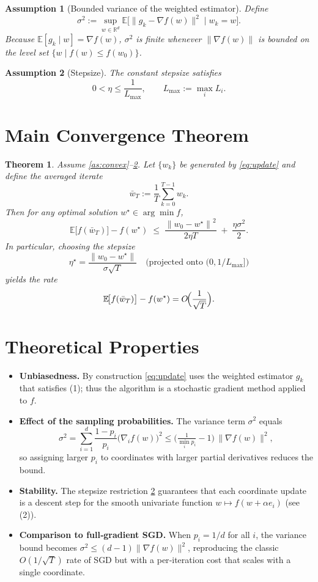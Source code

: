 \documentclass{article}
\newtheorem{theorem}{Theorem}
\newtheorem{assumption}{Assumption}
\newcommand{\E}{\mathbb{E}}
\newcommand{\R}{\mathbb{R}}
\newcommand{\norm}[1]{\left\lVert #1\right\rVert}
\begin{document}
\begin{assumption}[Bounded variance of the weighted estimator]\label{as:var}
Define
\[
\sigma^{2}:=\sup_{w\in\R^{d}}
\E\!\bigl[\|g_k-\nabla f(w)\|^{2}\mid w_k=w\bigr].
\]
Because $\E[g_k\mid w]=\nabla f(w)$, $\sigma^{2}$ is finite whenever
$\|\nabla f(w)\|$ is bounded on the level set $\{w\mid f(w)\le f(w_0)\}$.
\end{assumption}

\begin{assumption}[Stepsize]\label{as:stepsize}
The constant stepsize satisfies
\[
0<\eta\le\frac{1}{L_{\max}},\qquad 
L_{\max}:=\max_{i}L_i .
\]
\end{assumption}

\section*{Main Convergence Theorem}
\begin{theorem}\label{thm:conv}
Assume \ref{as:convex}--\ref{as:stepsize}. Let $\{w_k\}$ be generated by
\eqref{eq:update} and define the averaged iterate
\[
\bar w_T:=\frac{1}{T}\sum_{k=0}^{T-1}w_k .
\]
Then for any optimal solution $w^{\star}\in\arg\min f$,
\[
\E\!\bigl[f(\bar w_T)\bigr]-f(w^{\star})
\;\le\;
\frac{\norm{w_0-w^{\star}}^{2}}{2\eta T}
\;+\;\frac{\eta\sigma^{2}}{2}.
\tag{3}
\]
In particular, choosing the stepsize
\[
\eta^{\star}= \frac{\norm{w_0-w^{\star}}}{\sigma\sqrt{T}}
\quad\text{(projected onto }(0,1/L_{\max}]\text{)}
\]
yields the rate
\[
\E\!\bigl[f(\bar w_T)\bigr]-f(w^{\star}) = O\!\Bigl(\frac{1}{\sqrt{T}}\Bigr).
\]
\end{theorem}

\section*{Theoretical Properties}
\begin{itemize}
\item \textbf{Unbiasedness.} By construction \eqref{eq:update} uses the
weighted estimator $g_k$ that satisfies (1); thus the algorithm is a
stochastic gradient method applied to $f$.
\item \textbf{Effect of the sampling probabilities.}
The variance term $\sigma^{2}$ equals
\[
\sigma^{2}= \sum_{i=1}^{d}\frac{1-p_i}{p_i}\bigl(\nabla_i f(w)\bigr)^{2}
\le \bigl(\tfrac{1}{\min_i p_i}-1\bigr)\,\|\nabla f(w)\|^{2},
\]
so assigning larger $p_i$ to coordinates with larger partial derivatives
reduces the bound.
\item \textbf{Stability.}
The stepsize restriction \ref{as:stepsize} guarantees that each coordinate
update is a descent step for the smooth univariate function
$w\mapsto f(w+\alpha e_i)$ (see (2)).
\item \textbf{Comparison to full‑gradient SGD.}
When $p_i=1/d$ for all $i$, the variance bound becomes
$\sigma^{2}\le (d-1)\|\nabla f(w)\|^{2}$, reproducing the classic
$O(1/\sqrt{T})$ rate of SGD but with a per‑iteration cost that scales with a
single coordinate.
\end{itemize}
\end{document}
